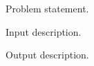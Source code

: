 \documentclass{sim-statement}
\date{}
\begin{document}
\begin{statement}

Problem statement.

\sectionInput
Input description.

\sectionOutput
Output description.

\begin{samples} %
\end{samples}

\begin{grading}
\end{grading}

\end{statement}
\end{document}
